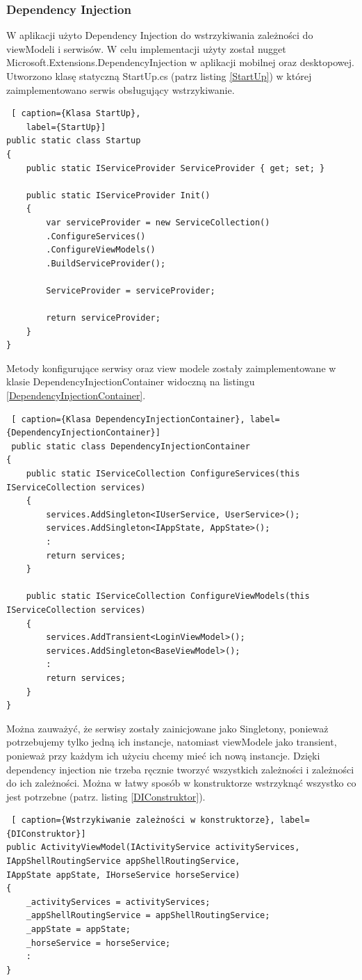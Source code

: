 \documentclass[12pt,oneside]{report}
\begin{document}
\subsubsection{Dependency Injection}
W aplikacji użyto Dependency Injection do wstrzykiwania zależności do viewModeli i serwisów. W celu implementacji użyty został nugget Microsoft.Extensions.DependencyInjection w aplikacji mobilnej oraz desktopowej. Utworzono klasę statyczną StartUp.cs (patrz listing \ref{StartUp}) w której zaimplementowano serwis obsługujący wstrzykiwanie.\\
\begin{lstlisting} [ caption={Klasa StartUp},
	label={StartUp}]	
public static class Startup
{
	public static IServiceProvider ServiceProvider { get; set; }
	
	public static IServiceProvider Init()
	{
		var serviceProvider = new ServiceCollection()
		.ConfigureServices()
		.ConfigureViewModels()
		.BuildServiceProvider();
		
		ServiceProvider = serviceProvider;
		
		return serviceProvider;
	}
}
\end{lstlisting}	
Metody konfigurujące serwisy oraz view modele zostały zaimplementowane w klasie DependencyInjectionContainer widoczną na listingu \ref{DependencyInjectionContainer}.\\
\begin{lstlisting} [ caption={Klasa DependencyInjectionContainer}, label={DependencyInjectionContainer}]	
 public static class DependencyInjectionContainer
{
	public static IServiceCollection ConfigureServices(this IServiceCollection services)
	{
		services.AddSingleton<IUserService, UserService>();
		services.AddSingleton<IAppState, AppState>();
		:
		return services;
	}
	
	public static IServiceCollection ConfigureViewModels(this IServiceCollection services)
	{
		services.AddTransient<LoginViewModel>();
		services.AddSingleton<BaseViewModel>();
		:
		return services;
	}
}
\end{lstlisting}
Można zauważyć, że serwisy zostały zainicjowane jako Singletony, ponieważ potrzebujemy tylko jedną ich instancje, natomiast viewModele jako transient, ponieważ przy każdym ich użyciu chcemy mieć ich nową instancje.
Dzięki dependency injection nie trzeba ręcznie tworzyć wszystkich zależności i zależności do ich zależności. Można w łatwy sposób w konstruktorze wstrzyknąć wszystko co jest potrzebne (patrz. listing \ref{DIConstruktor}).
\begin{lstlisting} [ caption={Wstrzykiwanie zależności w konstruktorze}, label={DIConstruktor}]	
public ActivityViewModel(IActivityService activityServices, IAppShellRoutingService appShellRoutingService,
IAppState appState, IHorseService horseService)
{
	_activityServices = activityServices;
	_appShellRoutingService = appShellRoutingService;
	_appState = appState;
	_horseService = horseService;
	:
}
\end{lstlisting}
\end{document}
